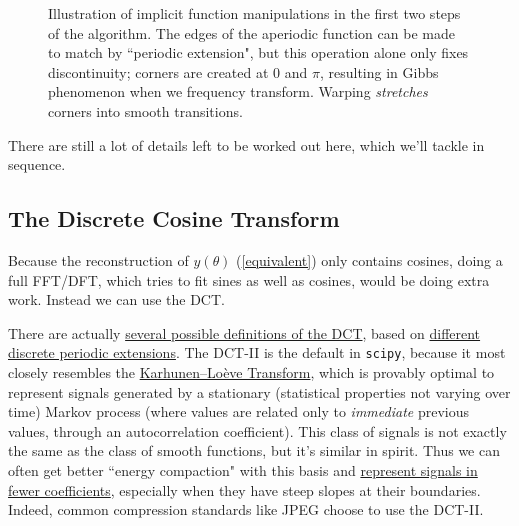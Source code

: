 \documentclass[10pt]{article}
\begin{document}
\begin{figure}[h!]
\begin{center}
\end{center}
\captionsetup{width=0.85\textwidth}
\caption*{\small Illustration of implicit function manipulations in the first two steps of the algorithm. The edges of the aperiodic function can be made to match by ``periodic extension", but this operation alone only fixes discontinuity; corners are created at 0 and $\pi$, resulting in Gibbs phenomenon when we frequency transform. Warping \textit{stretches} corners into smooth transitions.}
\end{figure}

There are still a lot of details left to be worked out here, which we'll tackle in sequence.

\subsection{The Discrete Cosine Transform}\label{fftdct}

Because the reconstruction of $y(\theta)$ (\autoref{equivalent}) only contains cosines, doing a full FFT/DFT, which tries to fit sines as well as cosines, would be doing extra work. Instead we can use the DCT.

There are actually \href{https://docs.scipy.org/doc/scipy/reference/generated/scipy.fft.dct.html}{several possible definitions of the DCT}\cite{dct}, based on \href{https://en.wikipedia.org/wiki/Discrete_cosine_transform#Informal_overview}{different discrete periodic extensions}. The DCT-II is the default in \texttt{scipy}\cite{dct}, because it most closely resembles the \href{https://www.farbrausch.de/%7Efg/articles/dct_klt.pdf}{Karhunen–Loève Transform}\cite{klt}, which is provably optimal to represent signals generated by a stationary (statistical properties not varying over time) Markov process (where values are related only to \textit{immediate} previous values, through an autocorrelation coefficient). This class of signals is not exactly the same as the class of smooth functions, but it's similar in spirit. Thus we can often get better ``energy compaction" with this basis and \href{https://dsp.stackexchange.com/a/96197/40873}{represent signals in fewer coefficients}\cite{energycompaction}, especially when they have steep slopes at their boundaries. Indeed, common compression standards like JPEG choose to use the DCT-II.
\end{document}
